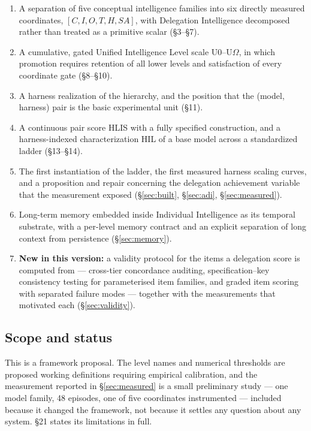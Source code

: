 \documentclass[11pt]{article}
\theoremstyle{definition}
\newcommand{\Om}{\ensuremath{\Omega}}
\begin{document}
\begingroup\sloppy
\begin{enumerate}
\item A separation of five conceptual intelligence families into six directly measured coordinates,
      $[C,I,O,T,H,SA]$, with Delegation Intelligence decomposed rather than treated as a primitive scalar (\S3--\S7).
\item A cumulative, gated Unified Intelligence Level scale U0--U\Om{}, in which promotion requires retention of all lower levels and satisfaction of every coordinate gate (\S8--\S10).
\item A harness realization of the hierarchy, and the position that the (model, harness) pair is the basic experimental unit (\S11).
\item A continuous pair score HLIS with a fully specified construction, and a harness-indexed characterization HIL of a base model across a standardized ladder (\S13--\S14).
\item The first instantiation of the ladder, the first measured harness scaling curves, and a proposition and repair concerning the delegation achievement variable that the measurement exposed (\S\ref{sec:built}, \S\ref{sec:adi}, \S\ref{sec:measured}).
\item Long-term memory embedded inside Individual Intelligence as its temporal substrate, with a per-level memory contract and an explicit separation of long context from persistence (\S\ref{sec:memory}).
\item \textbf{New in this version:} a validity protocol for the items a delegation score is computed from --- cross-tier concordance auditing, specification--key consistency testing for parameterised item families, and graded item scoring with separated failure modes --- together with the measurements that motivated each (\S\ref{sec:validity}).
\end{enumerate}
\endgroup

\subsection{Scope and status}

This is a framework proposal. The level names and numerical thresholds are proposed working definitions requiring empirical calibration, and the measurement reported in \S\ref{sec:measured} is a small preliminary study --- one model family, 48 episodes, one of five coordinates instrumented --- included because it changed the framework, not because it settles any question about any system. \S21 states its limitations in full.
\end{document}
